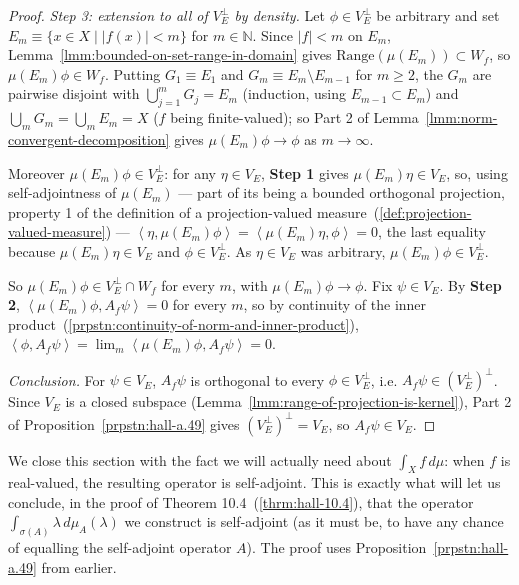 \begin{proof}
\textit{Step 3: extension to all of $V_E^\perp$ by density.} Let $\phi \in V_E^\perp$ be arbitrary and set $E_m \equiv \{ x \in X \mid \lvert f(x) \rvert < m \}$ for $m \in \mathbb{N}$. Since $\lvert f \rvert < m$ on $E_m$, Lemma~\ref{lmm:bounded-on-set-range-in-domain} gives $\text{Range}(\mu(E_m)) \subset W_f$, so $\mu(E_m)\phi \in W_f$. Putting $G_1 \equiv E_1$ and $G_m \equiv E_m \setminus E_{m-1}$ for $m \ge 2$, the $G_m$ are pairwise disjoint with $\bigcup_{j=1}^m G_j = E_m$ (induction, using $E_{m-1} \subset E_m$) and $\bigcup_m G_m = \bigcup_m E_m = X$ ($f$ being finite-valued); so Part 2 of Lemma~\ref{lmm:norm-convergent-decomposition} gives $\mu(E_m)\phi \to \phi$ as $m \to \infty$.

Moreover $\mu(E_m)\phi \in V_E^\perp$: for any $\eta \in V_E$, \textbf{Step 1} gives $\mu(E_m)\eta \in V_E$, so, using self-adjointness of $\mu(E_m)$ — part of its being a bounded orthogonal projection, property 1 of the definition of a projection-valued measure~(\ref{def:projection-valued-measure}) — $\left< \eta, \mu(E_m)\phi \right> = \left< \mu(E_m)\eta, \phi \right> = 0$, the last equality because $\mu(E_m)\eta \in V_E$ and $\phi \in V_E^\perp$. As $\eta \in V_E$ was arbitrary, $\mu(E_m)\phi \in V_E^\perp$.

So $\mu(E_m)\phi \in V_E^\perp \cap W_f$ for every $m$, with $\mu(E_m)\phi \to \phi$. Fix $\psi \in V_E$. By \textbf{Step 2}, $\left< \mu(E_m)\phi, A_f\psi \right> = 0$ for every $m$, so by continuity of the inner product~(\ref{prpstn:continuity-of-norm-and-inner-product}), $\left< \phi, A_f\psi \right> = \lim_m \left< \mu(E_m)\phi, A_f\psi \right> = 0$.

\textit{Conclusion.} For $\psi \in V_E$, $A_f\psi$ is orthogonal to every $\phi \in V_E^\perp$, i.e. $A_f\psi \in \left( V_E^\perp \right)^\perp$. Since $V_E$ is a closed subspace (Lemma~\ref{lmm:range-of-projection-is-kernel}), Part 2 of Proposition~\ref{prpstn:hall-a.49} gives $\left( V_E^\perp \right)^\perp = V_E$, so $A_f\psi \in V_E$.
\end{proof}

We close this section with the fact we will actually need about $\int_X f \, d\mu$: when $f$ is real-valued, the resulting operator is self-adjoint. This is exactly what will let us conclude, in the proof of Theorem 10.4~(\ref{thrm:hall-10.4}), that the operator $\int_{\sigma(A)} \lambda \, d\mu_A(\lambda)$ we construct is self-adjoint (as it must be, to have any chance of equalling the self-adjoint operator $A$). The proof uses Proposition~\ref{prpstn:hall-a.49} from earlier.

